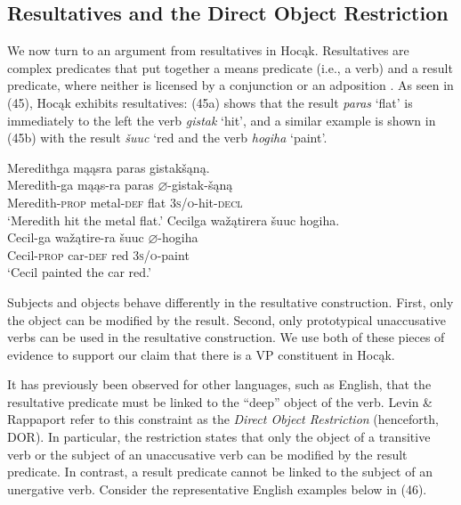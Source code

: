 \documentclass[output=paper]{LSP/langsci}
\begin{document}
\subsection{Resultatives and the Direct Object Restriction}

We now turn to an argument from resultatives in Hoc\k{a}k. Resultatives are complex predicates that put together a means predicate (i.e., a verb) and a result predicate, where neither is licensed by a conjunction or an adposition \citep[507]{Williams2008}. As seen in (45), Hoc\k{a}k exhibits resultatives: (45a) shows that the result \textit{paras} `flat' is immediately to the left the verb \textit{gistak} `hit', and a similar example is shown in (45b) with the result \textit{\v{s}uuc} `red and the verb \textit{hogiha} `paint'.

\begin{exe}
\ex
\begin{xlist}
\ex 
\glll Meredithga	m\k{a}\k{a}sra		paras	gistak\v{s}\k{a}n\k{a}.\\
Meredith-ga			m\k{a}\k{a}s-ra	paras	$\varnothing$-gistak-\v{s}\k{a}n\k{a} \\
	Meredith-\textsc{prop}		metal-\textsc{def}		flat	 \textsc{3s/o}-hit-\textsc{decl} \\
\trans `Meredith hit the metal flat.'
\ex 
\glll Cecilga	wa\v{z}\k{a}tirera	 \v{s}uuc	hogiha.\\
Cecil-ga	wa\v{z}\k{a}tire-ra \v{s}uuc	$\varnothing$-hogiha \\
	Cecil-\textsc{prop}	car-\textsc{def}	red		\textsc{3s/o}-paint \\
\trans `Cecil painted the car red.'
\end{xlist}
\end{exe}

Subjects and objects behave differently in the resultative construction. First, only the object can be modified by the result. Second, only prototypical unaccusative verbs can be used in the resultative construction. We use both of these pieces of evidence to support our claim that there is a VP constituent in Hoc\k{a}k.

It has previously been observed for other languages, such as English, that the resultative predicate must be linked to the ``deep'' object of the verb. Levin \& Rappaport \citet{Hovav1995} refer to this constraint as the \textit{Direct Object Restriction} (henceforth, DOR). In particular, the restriction states that only the object of a transitive verb or the subject of an unaccusative verb can be modified by the result predicate. In contrast, a result predicate cannot be linked to the subject of an unergative verb. Consider the representative English examples below in (46).
\end{document}
